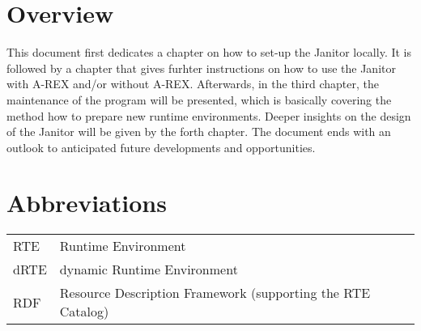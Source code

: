 \section{Overview}

This document first dedicates a chapter on how to set-up the Janitor locally. It is followed by a chapter that gives furhter instructions on how to 
use the Janitor with A-REX and/or without A-REX. Afterwards, in the third chapter, the maintenance of the program will be presented, 
which is basically covering the method how to prepare new runtime environments. Deeper insights on the design of the Janitor will 
be given by the forth chapter. The document ends with an outlook to anticipated future developments and opportunities.

\section*{Abbreviations}

\begin{tabular}{l@{--}p{150mm}}
RTE&Runtime Environment\\
dRTE&dynamic Runtime Environment\\
RDF&Resource Description Framework (supporting the RTE Catalog)\\
\end{tabular}






 

